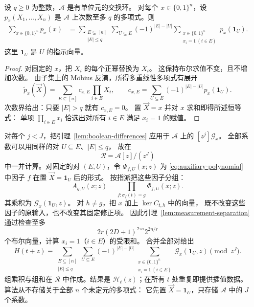 \begin{lemma}\label{lem:boolean-differences}
设 $q\ge0$ 为整数，$\mathcal A$ 是有单位元的交换环。
对每个 $x\in\{0,1\}^n$，设
$p_x(X_1,\ldots,X_n)$ 是 $\mathcal A$ 上次数至多 $q$
的多项式。则
\begin{align}
 \sum_{x\in\{0,1\}^n}p_x(x)
 &=\sum_{\substack{E\subseteq[n]\\|E|\le q}}
   \sum_{U\subseteq E}(-1)^{|E|-|U|}
   \sum_{\substack{x\in\{0,1\}^n\\x_i=1\ (i\in E)}}
                  p_x(\mathbf1_U).
 \label{eq:boolean-differences}
\end{align}
这里 $\mathbf1_U$ 是 $U$ 的指示向量。
\end{lemma}
\begin{proof}
对固定的 $x$，把 $X_i$ 的每个正幂替换为 $X_i$。
这保持布尔求值不变，且不增加次数。
由子集上的 M\"obius 反演，所得多重线性多项式有展开
\[
 \widetilde p_x(\vec{X})=\sum_{E\subseteq[n]}c_{x,E}\prod_{i\in E}X_i,
 \qquad
 c_{x,E}=\sum_{U\subseteq E}(-1)^{|E|-|U|}p_x(\mathbf1_U).
\]
次数界给出：只要 $|E|>q$ 就有 $c_{x,E}=0$。
置 $\vec{X}=x$ 并对 $x$ 求和即得所述恒等式：
单项 $\prod_{i\in E}x_i$ 恰选出对所有 $i\in E$
满足 $x_i=1$ 的赋值。
\end{proof}

对每个 $j<J$，把引理~\ref{lem:boolean-differences}
应用于 $\mathcal A$ 上的 $[z^j]\mathcal G_x$。
全部系数可以用同样的对 $U\subseteq E$、$|E|\le q$，
故在
\[
 \mathcal R=\mathcal A[z]/(z^J)
\]
中一并计算。对固定的对 $(E,U)$，令 $\Phi_{f,U}(x;z)$
为 \eqref{eq:auxiliary-polynomial} 中因子 $f$
在置 $\vec X=\mathbf1_U$ 后的形式。
按指派把这些因子分组：
\begin{equation}\label{eq:group-polynomial}
 A_{g,U}(x;z)=\prod_{f:\sigma_f(t)=g}\Phi_{f,U}(x;z).
\end{equation}
其乘积为 $\mathcal G_x(\mathbf1_U,z)$。
对 $h\ne g$，把 $x$ 加上 $\ker C_{t,h}$ 中的向量，
既不改变这些因子的原输入，也不改变其固定修正项。
因此引理~\ref{lem:measurement-separation} 通过检查至多
\begin{equation}\label{eq:boolean-enumeration}
 2r(2D+1)^{2\tau n}2^{2n/r}
\end{equation}
个布尔向量，计算 $x_i=1$（$i\in E$）的受限和。
合并全部对给出
\begin{equation}\label{eq:full-taylor-sum}
 H(t+z)\equiv
 \sum_{\substack{E\subseteq[n]\\|E|\le q}}
 \sum_{U\subseteq E}(-1)^{|E|-|U|}
 \sum_{\substack{x\in\{0,1\}^n\\x_i=1\ (i\in E)}}
       \mathcal G_x(\mathbf1_U,z)\pmod{z^J}.
\end{equation}
组乘积与组和在 $\mathcal R$ 中作成。结果是
$\mathcal H_t(z)$；在所有 $t$ 处重复即提供插值数据。
算法从不存储关于全部 $n$ 个未定元的多项式：
它先置 $\vec X=\mathbf1_U$，只存储 $\mathcal A$ 中的
$J$ 个系数。

